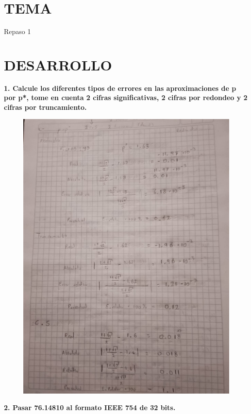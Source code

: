 \documentclass[12pt]{article}
\begin{document}
\section{TEMA}
Repaso 1

\vspace{0.5cm}

\section{DESARROLLO}

\textbf{1. Calcule los diferentes tipos de errores en las aproximaciones de p por  p*, tome en cuenta 2 cifras significativas, 2 cifras por redondeo y 2 cifras por truncamiento.} 

\begin{figure}[H]
\centering
\includegraphics[width=1\textwidth]{./inFiles/Figures/11.jpeg}
\end{figure}

\textbf{2. Pasar 76.14810 al formato IEEE 754 de 32 bits.} 
\end{document}
